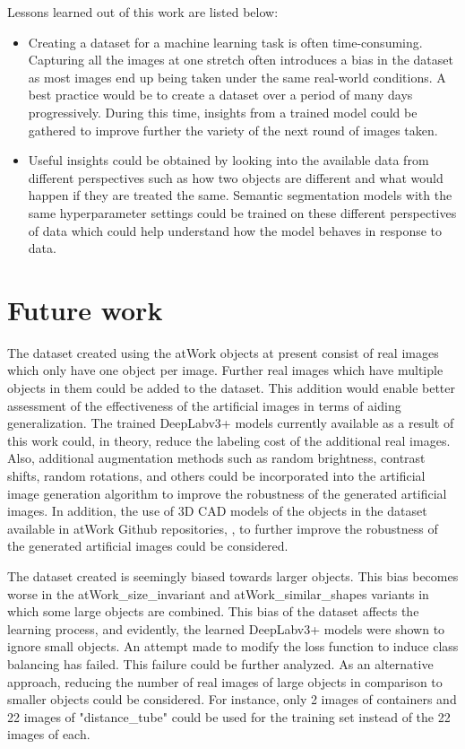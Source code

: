 Lessons learned out of this work are listed below:
	\begin{itemize}
		\item Creating a dataset for a machine learning task is often time-consuming. Capturing all the images at one stretch often introduces a bias in the dataset as most images end up being taken under the same real-world conditions. A best practice would be to create a dataset over a period of many days progressively. During this time, insights from a trained model could be gathered to improve further the variety of the next round of images taken.
		\item Useful insights could be obtained by looking into the available data from different perspectives such as how two objects are different and what would happen if they are treated the same. Semantic segmentation models with the same hyperparameter settings could be trained on these different perspectives of data which could help understand how the model behaves in response to data.
	\end{itemize}

\section{Future work}

The dataset created using the atWork objects at present consist of real images which only have one object per image. Further real images which have multiple objects in them could be added to the dataset. This addition would enable better assessment of the effectiveness of the artificial images in terms of aiding generalization. The trained DeepLabv3+ models currently available as a result of this work could, in theory, reduce the labeling cost of the additional real images. Also, additional augmentation methods such as random brightness, contrast shifts, random rotations, and others could be incorporated into the artificial image generation algorithm to improve the robustness of the generated artificial images. In addition, the use of 3D CAD models of the objects in the dataset available in atWork Github repositories, \cite{atwork_models}, \cite{atwork_models_rockin} to further improve the robustness of the generated artificial images could be considered.

The dataset created is seemingly biased towards larger objects. This bias becomes worse in the atWork\_size\_invariant and atWork\_similar\_shapes variants in which some large objects are combined. This bias of the dataset affects the learning process, and evidently, the learned DeepLabv3+ models were shown to ignore small objects. An attempt made to modify the loss function to induce class balancing has failed. This failure could be further analyzed. As an alternative approach, reducing the number of real images of large objects in comparison to smaller objects could be considered. For instance, only 2 images of containers and 22 images of "distance\_tube" could be used for the training set instead of the 22 images of each.

